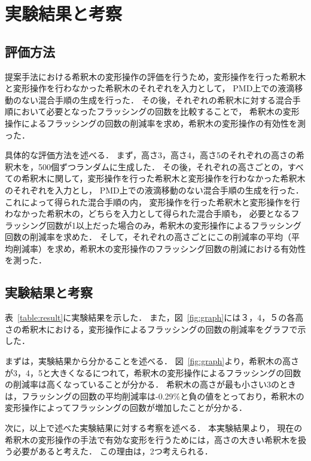\chapter{実験結果と考察}

\section{評価方法}
提案手法における希釈木の変形操作の評価を行うため，変形操作を行った希釈木と変形操作を行わなかった希釈木のそれぞれを入力として，
PMD上での液滴移動のない混合手順の生成を行った．
その後，それぞれの希釈木に対する混合手順において必要となったフラッシングの回数を比較することで，
希釈木の変形操作によるフラッシングの回数の削減率を求め，希釈木の変形操作の有効性を測った．

具体的な評価方法を述べる．
まず，高さ3，高さ4，高さ5のそれぞれの高さの希釈木を，500個ずつランダムに生成した．
その後，それぞれの高さごとの，すべての希釈木に関して，変形操作を行った希釈木と変形操作を行わなかった希釈木のそれぞれを入力とし，
PMD上での液滴移動のない混合手順の生成を行った．
これによって得られた混合手順の内，
変形操作を行った希釈木と変形操作を行わなかった希釈木の，どちらを入力として得られた混合手順も，
必要となるフラッシング回数が1以上だった場合のみ，希釈木の変形操作によるフラッシング回数の削減率を求めた．
そして，それぞれの高さごとにこの削減率の平均（平均削減率）を求め，希釈木の変形操作のフラッシング回数の削減における有効性を測った．

\section{実験結果と考察}
表~\ref{table:result}に実験結果を示した．
また，図~\ref{fig:graph}には３，4，５の各高さの希釈木における，変形操作によるフラッシングの回数の削減率をグラフで示した．

まずは，実験結果から分かることを述べる．
図~\ref{fig:graph}より，希釈木の高さが3，4，5と大きくなるにつれて，希釈木の変形操作によるフラッシングの回数の削減率は高くなっていることが分かる．
希釈木の高さが最も小さい3のときは，フラッシングの回数の平均削減率は-0.29$\%$と負の値をとっており，希釈木の変形操作によってフラッシングの回数が増加したことが分かる．

次に，以上で述べた実験結果に対する考察を述べる．
本実験結果より，
現在の希釈木の変形操作の手法で有効な変形を行うためには，高さの大きい希釈木を扱う必要があると考えた．
この理由は，2つ考えられる．

